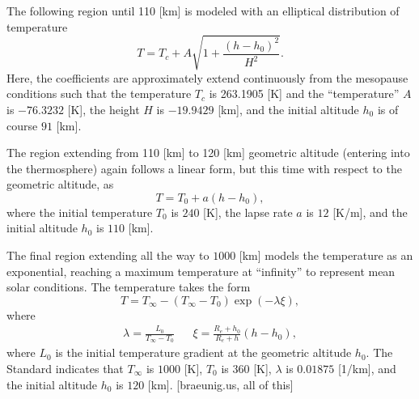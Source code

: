 \documentclass[11pt,dvipsnames]{thesis}
\begin{document}
The following region until 110 [\si{\km}] is modeled with an elliptical distribution of temperature
\begin{equation}
T = T_c + A \sqrt{1 + \frac{(h - h_0)^2}{H^2}}.
\end{equation}
Here, the coefficients are approximately extend continuously from the mesopause conditions such that the temperature $T_c$ is 263.1905 [\si{\K}] and the ``temperature'' $A$ is $-76.3232$ [\si{\K}], the height $H$ is $-19.9429$ [\si{\km}], and the initial altitude $h_0$ is of course $91$ [\si{\km}].

The region extending from 110 [\si{\km}] to 120 [\si{\km}] geometric altitude (entering into the thermosphere) again follows a linear form, but this time with respect to the geometric altitude, as
\begin{equation}
T = T_0 + a (h - h_0),
\end{equation}
where the initial temperature $T_0$ is $240$ [\si{\K}], the lapse rate $a$ is $12$ [\si{\K/\m}], and the initial altitude $h_0$ is $110$ [\si{\km}].

The final region extending all the way to $1000$ [\si{\km}] models the temperature as an exponential, reaching a maximum temperature at ``infinity'' to represent mean solar conditions. The temperature takes the form
\begin{equation}
T = T_\infty - (T_\infty - T_0) \exp\left(-\lambda \xi\right),
\end{equation}
where
\begin{align}
\lambda = \frac{L_0}{T_\infty - T_0} && \xi = \frac{R_e + h_0}{R_e + h}(h - h_0),
\end{align}
where $L_0$ is the initial temperature gradient at the geometric altitude $h_0$. The Standard indicates that $T_\infty$ is $1000$ [\si{\K}], $T_0$ is $360$ [\si{\K}], $\lambda$ is $0.01875$ [\si{1/\km}], and the initial altitude $h_0$ is $120$ [\si{\km}]. [braeunig.us, all of this]
\end{document}
